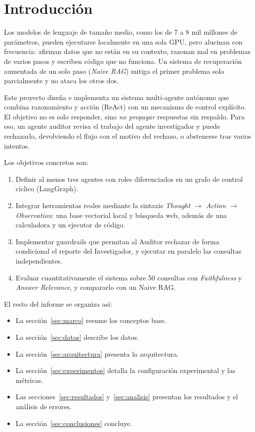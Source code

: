 \section{Introducción}

Los modelos de lenguaje de tamaño medio, como los de 7 a 8 mil millones de parámetros, pueden ejecutarse localmente en una sola GPU, pero alucinan con frecuencia: afirman datos que no están en su contexto, razonan mal en problemas de varios pasos y escriben código que no funciona.
Un sistema de recuperación aumentada de un solo paso (\emph{Naive RAG}) mitiga el primer problema solo parcialmente y no ataca los otros dos.

Este proyecto diseña e implementa un sistema multi-agente autónomo que combina razonamiento y acción (ReAct) con un mecanismo de control explícito.
El objetivo no es solo responder, sino \emph{no propagar} respuestas sin respaldo.
Para eso, un agente auditor revisa el trabajo del agente investigador y puede rechazarlo, devolviendo el flujo con el motivo del rechazo, o abstenerse tras varios intentos.

Los objetivos concretos son:
\begin{enumerate}
  \item Definir al menos tres agentes con roles diferenciados en un grafo de control cíclico (LangGraph).
  \item Integrar herramientas reales mediante la sintaxis \emph{Thought $\rightarrow$ Action $\rightarrow$ Observation}: una base vectorial local y búsqueda web, además de una calculadora y un ejecutor de código.
  \item Implementar guardrails que permitan al Auditor rechazar de forma condicional el reporte del Investigador, y ejecutar en paralelo las consultas independientes.
  \item Evaluar cuantitativamente el sistema sobre 50 consultas con \emph{Faithfulness} y \emph{Answer Relevance}, y compararlo con un Naive RAG.
\end{enumerate}

El resto del informe se organiza así:
\begin{itemize}
  \item La sección~\ref{sec:marco} resume los conceptos base.
  \item La sección~\ref{sec:datos} describe los datos.
  \item La sección~\ref{sec:arquitectura} presenta la arquitectura.
  \item La sección~\ref{sec:experimentos} detalla la configuración experimental y las métricas.
  \item Las secciones~\ref{sec:resultados} y~\ref{sec:analisis} presentan los resultados y el análisis de errores.
  \item La sección~\ref{sec:conclusiones} concluye.
\end{itemize}
